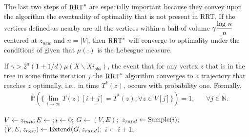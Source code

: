 The last two steps of $\textnormal{RRT}^*$ are especially important because they convey upon the algorithm the eventuality of optimality that is not present in RRT. If the vertices defined as nearby are all the vertices within a ball of volume $\gamma \dfrac{\textnormal{log }n}{n}$ centered at $z_{new}$ and  $n = |V|$, then $\textnormal{RRT}^*$ will converge to optimality under the conditions of  given that $\mu(\cdot)$ is the Lebesgue measure.
\begin{theorem}\label{RRTopt}
If $\gamma > 2^d(1+1/d)\mu(X \backslash Xi_{obs})$, the event that for any vertex $z$ that is in the tree in some finite iteration $j$ the $\textnormal{RRT}^*$ algorithm converges to a trajectory that reaches $z$ optimally, i.e., in time $T^*(z)$, occurs with probability one. Formally,
\begin{align*}
&\mathbb{P}(\{\lim\limits_{i \rightarrow \infty}T(z)[i+j] = T^*(z),   \forall z \in V[j]\}) = 1, && \forall j \in \mathbb{N}.
\end{align*}   
\end{theorem}

\begin{algorithm}
\caption{$\textnormal{RRT}^*$ \cite{karaman}}\label{RRTalg}
\begin{algorithmic}[1]
	\State $V \leftarrow {z_{init}}; E \leftarrow \null; i \leftarrow 0;$
	 \do{}
		\State $G \leftarrow (V,E);$
		\State $z_{rand} \leftarrow \textnormal{Sample}(i);$
		\State $(V,E,z_{new}) \leftarrow \textnormal{Extend}(G,z_{rand});$
		\State $i \leftarrow i +1;$
	\EndWhile
\end{algorithmic}
\end{algorithm} 

